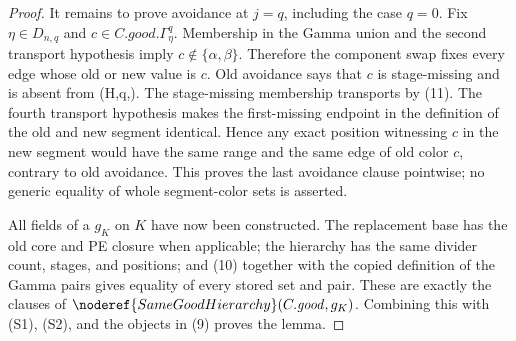 \begin{proof}
It remains to prove avoidance at \(j=q\), including the case \(q=0\).
Fix \(\eta\in D_{n,q}\) and
\(c\in C.\mathit{good}.\Gamma^q_\eta\).  Membership in the Gamma union
and the second transport hypothesis imply
\(c\notin\{\alpha,\beta\}\).  Therefore the component swap fixes every
edge whose old or new value is \(c\).  Old avoidance says that \(c\) is
stage-missing and is absent from
(H,q,\eta)\).  The stage-missing
membership transports by (11).  The fourth transport hypothesis makes
the first-missing endpoint in the definition of the old and new segment
identical.  Hence any exact position witnessing \(c\) in the new segment
would have the same range and the same edge of old color \(c\), contrary
to old avoidance.  This proves the last avoidance clause pointwise; no
generic equality of whole segment-color sets is asserted.

All fields of a  \(g_K\) on \(K\) have now been
constructed.  The replacement base has the old core and PE closure when
applicable; the hierarchy has the same divider count, stages, and
positions; and (10) together with the copied definition of the Gamma
pairs gives equality of every stored set and pair.  These are exactly the
clauses of
\(\noderef{SameGoodHierarchy}(C.\mathit{good},g_K)\).  Combining this
with (S1), (S2), and the objects in (9) proves the lemma.
\end{proof}
